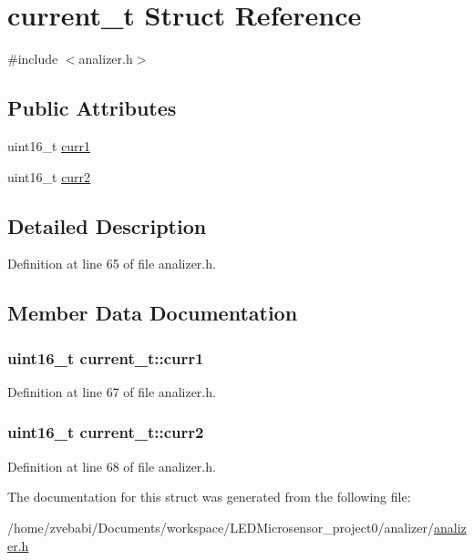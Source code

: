 \hypertarget{structcurrent__t}{\section{current\+\_\+t Struct Reference}
\label{structcurrent__t}
}


{\ttfamily \#include $<$analizer.\+h$>$}

\subsection*{Public Attributes}
\begin{DoxyCompactItemize}
\item 
uint16\+\_\+t \hyperlink{structcurrent__t_a67184c6cc4a6cc7d301880214965518b}{curr1}
\item 
uint16\+\_\+t \hyperlink{structcurrent__t_aa9880547f852fd6b213265f267da44c8}{curr2}
\end{DoxyCompactItemize}


\subsection{Detailed Description}


Definition at line 65 of file analizer.\+h.



\subsection{Member Data Documentation}
\hypertarget{structcurrent__t_a67184c6cc4a6cc7d301880214965518b}{
\subsubsection[{curr1}]{\setlength{\rightskip}{0pt plus 5cm}uint16\+\_\+t current\+\_\+t\+::curr1}}\label{structcurrent__t_a67184c6cc4a6cc7d301880214965518b}


Definition at line 67 of file analizer.\+h.

\hypertarget{structcurrent__t_aa9880547f852fd6b213265f267da44c8}{
\subsubsection[{curr2}]{\setlength{\rightskip}{0pt plus 5cm}uint16\+\_\+t current\+\_\+t\+::curr2}}\label{structcurrent__t_aa9880547f852fd6b213265f267da44c8}


Definition at line 68 of file analizer.\+h.



The documentation for this struct was generated from the following file\+:\begin{DoxyCompactItemize}
\item 
/home/zvebabi/\+Documents/workspace/\+L\+E\+D\+Microsensor\+\_\+project0/analizer/\hyperlink{analizer_8h}{analizer.\+h}\end{DoxyCompactItemize}
